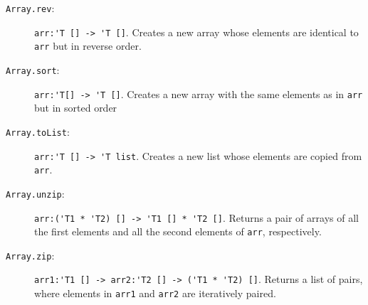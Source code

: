 \documentclass[fsharpnotes.tex]{subfiles}
\begin{document}
\begin{description}
\item[\texttt{Array.rev}:] \lstinline{arr:'T [] -> 'T []}. Creates a new array whose elements are identical to \lstinline{arr} but in reverse order.
\item[\texttt{Array.sort}:] \lstinline{arr:'T[] -> 'T []}. Creates a new array with the same elements as in \lstinline{arr} but in sorted order %
\item[\texttt{Array.toList}:] \lstinline{arr:'T [] -> 'T list}. Creates a new list whose elements are copied from \lstinline{arr}.
\item[\texttt{Array.unzip}:] \lstinline{arr:('T1 * 'T2) [] -> 'T1 [] * 'T2 []}. Returns a pair of arrays of all the first elements and all the second elements of \lstinline{arr}, respectively.
\item[\texttt{Array.zip}:] \lstinline{arr1:'T1 [] -> arr2:'T2 [] -> ('T1 * 'T2) []}. Returns a list of pairs, where elements in \lstinline{arr1} and \lstinline{arr2} are iteratively paired.
\end{description}
\end{document}
